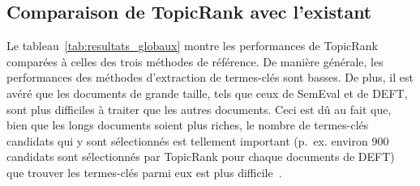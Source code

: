   \subsection{Comparaison de TopicRank avec l'existant}
  \label{subsec:comparaison_de_topicrank_avec_l_existant}
    Le tableau~\ref{tab:resultats_globaux} montre les performances de TopicRank
    comparées à celles des trois méthodes de référence. De manière générale, les
    performances des méthodes d'extraction de termes-clés sont basses. De
    plus, il est avéré que les documents de grande taille, tels que ceux de
    SemEval et de DEFT, sont plus difficiles à traiter que les autres documents.
    Ceci est dû au fait que, bien que les longs documents soient plus riches, le
    nombre de termes-clés candidats qui y sont sélectionnés est tellement
    important (p.~ex. environ 900 candidats sont sélectionnés par TopicRank pour
    chaque documents de DEFT) que trouver les termes-clés parmi eux est plus
    difficile~\cite{hasan2014state_of_the_art}.

